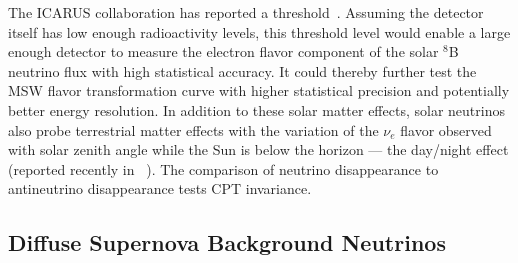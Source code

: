 The ICARUS collaboration has reported a 
threshold~\cite{Guglielmi:2012}. Assuming the %
detector itself
has low enough radioactivity levels, this threshold level would enable
a large enough detector to measure the electron flavor component of
the solar $^8$B neutrino flux with high statistical accuracy. It could %
thereby further test the MSW flavor transformation curve with higher statistical precision and
potentially better energy resolution. 
In addition to these solar
matter effects, solar 
neutrinos also probe terrestrial matter effects
with the variation of the $\nu_e$ flavor observed with solar zenith
angle while the Sun is below the horizon --- the day/night effect (reported recently in ~\cite{Renshaw:2013dzu}). 
%
The comparison
of neutrino disappearance to antineutrino disappearance tests CPT
invariance. 


\subsection{Diffuse Supernova Background Neutrinos}

